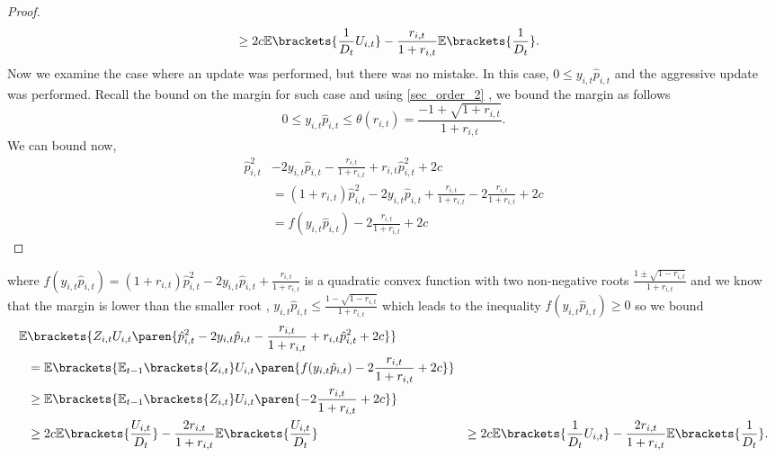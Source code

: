 \begin{proof}
\begin{equation*}
\begin{split}
&\ge 2c \mathbb{E}\brackets{\frac{1}{D_t}U_{i,t}}-\frac{r_{i,t}}{1+r_{i,t}}\mathbb{E}\brackets{\frac{1}{D_t}}.
\end{split}
\end{equation*}
Now we examine the case where an update was performed, but there was no mistake. In this case, $0\le y_{i,t}\hat{p}_{i,t}$ and the aggressive update was performed. Recall the bound on the margin for such case and using \eqref{sec_order_2} ,
we bound the margin as follows\begin{equation*}
0\le y_{i,t}\hat{p}_{i,t}\le \theta({r_{i,t}})=\frac{-1+\sqrt{1+r_{i,t}}}{1+r_{i,t}}.
\end{equation*}
We can bound now,
\begin{equation*}
\begin{split}
\hat{p}_{i,t}^2&-2y_{i,t}\hat{p}_{i,t}-\frac{r_{i,t}}{1+r_{i,t}}+r_{i,t}\hat{p}_{i,t}^{2}+2c\\
&=(1+r_{i,t})\hat{p}_{i,t}^2-2y_{i,t}\hat{p}_{i,t}+\frac{r_{i,t}}{1+r_{i,t}}-2\frac{r_{i,t}}{1+r_{i,t}}+2c\\
&=f(y_{i,t}\hat{p}_{i,t})-2\frac{r_{i,t}}{1+r_{i,t}}+2c
\end{split}
\end{equation*}
\end{proof}          
where $f(y_{i,t}\hat{p}_{i,t})=(1+r_{i,t})\hat{p}_{i,t}^2-2y_{i,t}\hat{p}_{i,t}+\frac{r_{i,t}}{1+r_{i,t}}$ is a quadratic convex function with two non-negative roots $\frac{1\pm\sqrt{1-r_{i,t}}}{1+r_{i,t}}$ and we know that the margin is lower than the smaller root , $y_{i,t}\hat{p}_{i,t}\le\frac{1-\sqrt{1-r_{i,t}}}{1+r_{i,t}}$ which leads to the inequality $f(y_{i,t}\hat{p}_{i,t})\ge0$ so we bound 
\begin{equation*}
\begin{split}
\mathbb{E}&\brackets{Z_{i,t}U_{i,t}\paren{\hat{p}_{i,t}^2-2y_{i,t}\hat{p}_{i,t}-\frac{r_{i,t}}{1+r_{i,t}}+r_{i,t}\hat{p}_{i,t}^{2}+2c}}\\
&=\mathbb{E}\brackets{\mathbb{E}_{t-1}\brackets{Z_{i,t}}U_{i,t}\paren{f(y_{i,t}\hat{p}_{i,t})-2\frac{r_{i,t}}{1+r_{i,t}}+2c}}\\
&\ge\mathbb{E}\brackets{\mathbb{E}_{t-1}\brackets{Z_{i,t}}U_{i,t}\paren{-2\frac{r_{i,t}}{1+r_{i,t}}+2c}}\\
&\ge 2c\mathbb{E}\brackets{\frac{U_{i,t}}{D_t}}-\frac{2r_{i,t}}{1+r_{i,t}}\mathbb{E}\brackets{\frac{U_{i,t}}{D_t}}
&\ge 2c\mathbb{E}\brackets{\frac{1}{D_t}U_{i,t}}-\frac{2r_{i,t}}{1+r_{i,t}}\mathbb{E}\brackets{\frac{1}{D_t}}.
\end{split}
\end{equation*}
